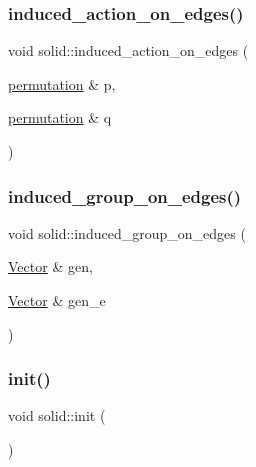 \mbox{\label{classsolid_a372d0459fd74de947a5cb0d53ddbd6f0}} 
\subsubsection{\texorpdfstring{induced\+\_\+action\+\_\+on\+\_\+edges()}{induced\_action\_on\_edges()}}
{\footnotesize\ttfamily void solid\+::induced\+\_\+action\+\_\+on\+\_\+edges (\begin{DoxyParamCaption}\item[{\mbox{\hyperlink{classpermutation}{permutation}} \&}]{p,  }\item[{\mbox{\hyperlink{classpermutation}{permutation}} \&}]{q }\end{DoxyParamCaption})}

\mbox{\label{classsolid_a081dd519a288f5bf2e406ce9dc76348d}} 
\subsubsection{\texorpdfstring{induced\+\_\+group\+\_\+on\+\_\+edges()}{induced\_group\_on\_edges()}}
{\footnotesize\ttfamily void solid\+::induced\+\_\+group\+\_\+on\+\_\+edges (\begin{DoxyParamCaption}\item[{\mbox{\hyperlink{class_vector}{Vector}} \&}]{gen,  }\item[{\mbox{\hyperlink{class_vector}{Vector}} \&}]{gen\+\_\+e }\end{DoxyParamCaption})}

\mbox{\label{classsolid_afc711954316958b35630fbc8542bcd05}} 
\subsubsection{\texorpdfstring{init()}{init()}}
{\footnotesize\ttfamily void solid\+::init (\begin{DoxyParamCaption}{ }\end{DoxyParamCaption})}

